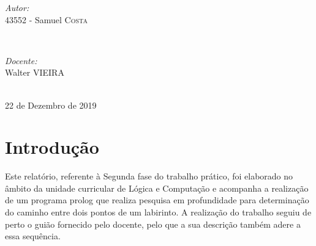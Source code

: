 \documentclass[11pt]{report}
\begin{document}
\begin{titlepage}
\vskip 70pt
\begin{minipage}{0.4\textwidth}
\begin{flushleft} \large
\emph{Autor:}\\
43552 - Samuel \textsc{Costa}\\
\end{flushleft}
\end{minipage}
~
\begin{minipage}{0.4\textwidth}
\begin{flushright} \large
\emph{Docente:} \\
Walter \textsc{VIEIRA}\\
\end{flushright}
\end{minipage}\\[3cm]


{\large 22 de Dezembro de 2019}\\[3cm] %


\vfill %

\end{titlepage}


\renewcommand\thesection{\arabic{section}}

\tableofcontents


\newpage


\section*{Introdução}
Este relatório, referente à Segunda fase do trabalho prático, foi elaborado no 
âmbito da unidade curricular de Lógica e Computação e acompanha a realização de um programa prolog que realiza pesquisa em profundidade para determinação do caminho entre dois pontos de um labirinto. A realização do trabalho seguiu de perto o guião fornecido pelo docente, pelo que a sua descrição também adere a essa sequência.
\newpage
\end{document}
